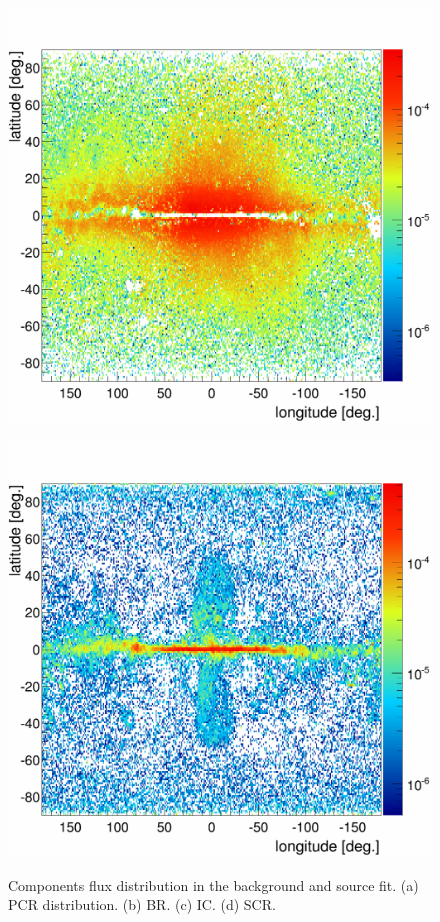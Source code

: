 \begin{figure}[H]
\begin{minipage}[h]{0.45\textwidth}
  	\subcaption{}
  	\label{app:BKGonly_BR}
  \end{minipage}
  \hfill
  \begin{minipage}[h]{0.45\textwidth}
  	\centering
	\includegraphics[width=1\linewidth]{pic/results/SCR_IC_Integral.png}
 	\subcaption{}
  	\label{app:BKGonly_IC}
  \end{minipage}
  \hfill
  \begin{minipage}[h]{0.45\textwidth}
  	\centering
	\includegraphics[width=1\linewidth]{pic/results/SCR_SCR_Integral.png}
 	\subcaption{}
  	\label{app:BKGonly_IC}
  \end{minipage}
  \caption[Components flux distribution in the background and source fit]{Components flux distribution in the background and source fit. (a) PCR distribution. (b) BR. (c) IC. (d) SCR.}
  \label{app:SCRonly_fit_distributions}
\end{figure}


